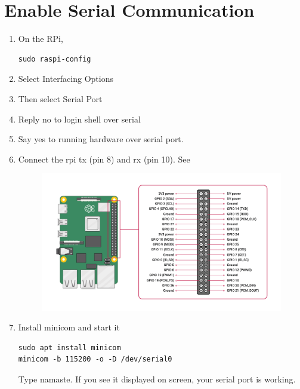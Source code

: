 \section{Enable Serial Communication}
\renewcommand{\theequation}{\theenumi}
\renewcommand{\thefigure}{\theenumi}
\begin{enumerate}[label=\thesection.\arabic*.,ref=\thesection.\theenumi]
\item On the RPi, 
\begin{lstlisting}
sudo raspi-config
\end{lstlisting}
\item Select Interfacing Options
\item Then select Serial Port
\item Reply no to login shell over serial
\item Say yes to running hardware over serial port.
\item Connect the rpi tx (pin 8) and rx (pin 10).  See 
	\begin{figure}[!h]
		\includegraphics[width=\columnwidth]{rpi/figs/rpi-gpio.png}
		\caption{}
		\label{fig:rpi-gpio}
	\end{figure}
\item Install minicom and start it
\begin{lstlisting}
sudo apt install minicom
minicom -b 115200 -o -D /dev/serial0
\end{lstlisting}
Type namaste.  If you see it displayed on screen, your serial port is working.
\end{enumerate}

